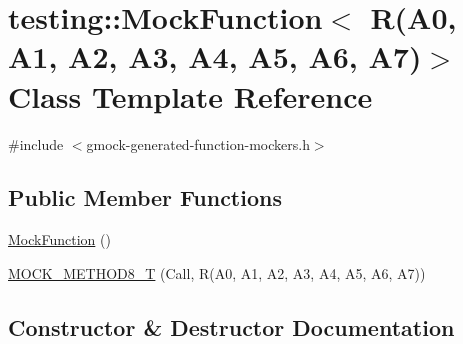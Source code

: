 \hypertarget{classtesting_1_1_mock_function_3_01_r_07_a0_00_01_a1_00_01_a2_00_01_a3_00_01_a4_00_01_a5_00_01_a6_00_01_a7_08_4}{}\section{testing\+:\+:Mock\+Function$<$ R(A0, A1, A2, A3, A4, A5, A6, A7)$>$ Class Template Reference}
\label{classtesting_1_1_mock_function_3_01_r_07_a0_00_01_a1_00_01_a2_00_01_a3_00_01_a4_00_01_a5_00_01_a6_00_01_a7_08_4}


{\ttfamily \#include $<$gmock-\/generated-\/function-\/mockers.\+h$>$}

\subsection*{Public Member Functions}
\begin{DoxyCompactItemize}
\item 
\hyperlink{classtesting_1_1_mock_function_3_01_r_07_a0_00_01_a1_00_01_a2_00_01_a3_00_01_a4_00_01_a5_00_01_a6_00_01_a7_08_4_ab2ac033046600396f088321ef0508e63}{Mock\+Function} ()
\item 
\hyperlink{classtesting_1_1_mock_function_3_01_r_07_a0_00_01_a1_00_01_a2_00_01_a3_00_01_a4_00_01_a5_00_01_a6_00_01_a7_08_4_a895c470e00e07294ab42c09588ae1e4c}{M\+O\+C\+K\+\_\+\+M\+E\+T\+H\+O\+D8\+\_\+T} (Call, R(A0, A1, A2, A3, A4, A5, A6, A7))
\end{DoxyCompactItemize}


\subsection{Constructor \& Destructor Documentation}
\mbox{\label{classtesting_1_1_mock_function_3_01_r_07_a0_00_01_a1_00_01_a2_00_01_a3_00_01_a4_00_01_a5_00_01_a6_00_01_a7_08_4_ab2ac033046600396f088321ef0508e63}} 
